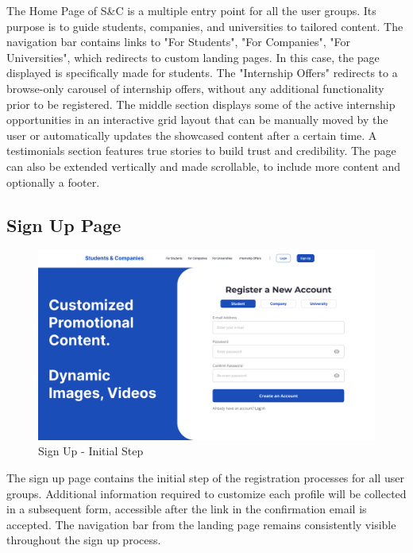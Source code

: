 The Home Page of S\&C is a multiple entry point for all the user groups. Its purpose is to guide students, companies, and universities to tailored content.
The navigation bar contains links to "For Students", "For Companies", "For Universities", which redirects to custom landing pages. In this case, the page displayed is specifically made for students.
The "Internship Offers" redirects to a browse-only carousel of internship offers, without any additional functionality prior to be registered.
The middle section displays some of the active internship opportunities in an interactive grid layout that can be manually moved by the user or automatically updates the showcased content after a certain time.
A testimonials section features true stories to build trust and credibility.
The page can also be extended vertically and made scrollable, to include more content and optionally a footer.

\subsection{Sign Up Page}
\label{subsec: sign_up_page}

\begin{figure} [H]
    \begin{center}
        \includegraphics[width=0.9\linewidth]{LaTeXCode/images/UI/Sign Up - Unified Version.png}
        \caption{Sign Up - Initial Step}
        \label{fig: sign_up_unified}
    \end{center}
\end{figure}

The sign up page contains the initial step of the registration processes for all user groups. Additional information required to customize each profile will be collected in a subsequent form, accessible after the link in the confirmation email is accepted.
The navigation bar from the landing page remains consistently visible throughout the sign up process.

